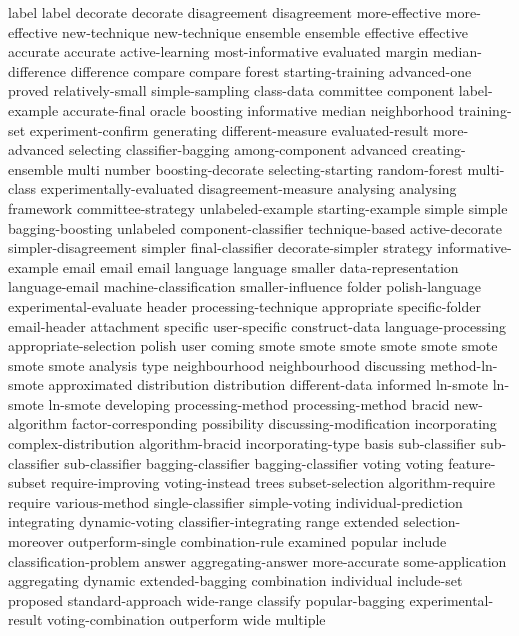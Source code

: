 label	label	
decorate	decorate	
disagreement	disagreement	
more-effective	more-effective	
new-technique	new-technique	
ensemble	ensemble	
effective	effective	
accurate	accurate	
active-learning	
most-informative	
evaluated	
margin	
median-difference	
difference	
compare	compare	
forest	
starting-training	
advanced-one	
proved	
relatively-small	
simple-sampling	
class-data	
committee	
component	
label-example	
accurate-final	
oracle	
boosting	
informative	
median	
neighborhood	
training-set	
experiment-confirm	
generating	
different-measure	
evaluated-result	
more-advanced	
selecting	
classifier-bagging	
among-component	
advanced	
creating-ensemble	
multi	
number	
boosting-decorate	
selecting-starting	
random-forest	
multi-class	
experimentally-evaluated	
disagreement-measure	
analysing	analysing	
framework	
committee-strategy	
unlabeled-example	
starting-example	
simple	simple	
bagging-boosting	
unlabeled	
component-classifier	
technique-based	
active-decorate	
simpler-disagreement	
simpler	
final-classifier	
decorate-simpler	
strategy	
informative-example	
email	email	email	
language	language	
smaller	
data-representation	
language-email	
machine-classification	
smaller-influence	
folder	
polish-language	
experimental-evaluate	
header	
processing-technique	
appropriate	
specific-folder	
email-header	
attachment	
specific	
user-specific	
construct-data	
language-processing	
appropriate-selection	
polish	
user	
coming	
smote	smote	smote	smote	smote	smote	smote	smote	
analysis	
type	
neighbourhood	neighbourhood	
discussing	
method-ln-smote	
approximated	
distribution	distribution	
different-data	
informed	
ln-smote	ln-smote	ln-smote	
developing	
processing-method	processing-method	
bracid	
new-algorithm	
factor-corresponding	
possibility	
discussing-modification	
incorporating	
complex-distribution	
algorithm-bracid	
incorporating-type	
basis	
sub-classifier	sub-classifier	sub-classifier	
bagging-classifier	bagging-classifier	
voting	voting	
feature-subset	
require-improving	
voting-instead	
trees	
subset-selection	
algorithm-require	
require	
various-method	
single-classifier	
simple-voting	
individual-prediction	
integrating	
dynamic-voting	
classifier-integrating	
range	
extended	
selection-moreover	
outperform-single	
combination-rule	
examined	
popular	
include	
classification-problem	
answer	
aggregating-answer	
more-accurate	
some-application	
aggregating	
dynamic	
extended-bagging	
combination	
individual	
include-set	
proposed	
standard-approach	
wide-range	
classify	
popular-bagging	
experimental-result	
voting-combination	
outperform	
wide	
multiple	
